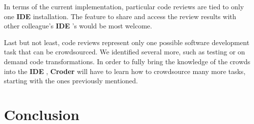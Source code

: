 \documentclass{sigchi}
\newcommand{\croder}{\textbf{Croder }}
\newcommand{\IDE}{\textbf{IDE }}
\begin{document}
In terms of the current implementation, particular code reviews are tied to only one \IDE installation. The feature to share and access the review results with other colleague's \IDE's would be most welcome.

Last but not least, code reviews represent only one possible software development task that can be crowdsourced. We identified several more, such as testing or on demand code transformations. In order to fully bring the knowledge of the crowds into the \IDE, \croder will have to learn how to crowdsource many more tasks, starting with the ones previously mentioned.


\section{Conclusion}



\end{document}
